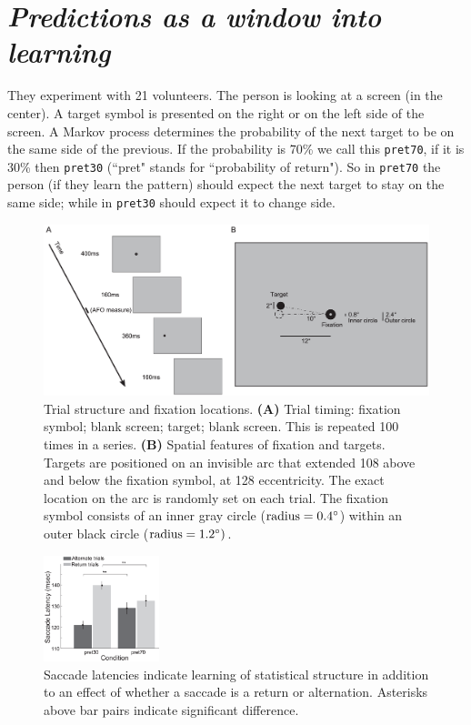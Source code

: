 \section[Predictions as a window into learning]{\textit{Predictions as a window into learning}\\ }
They experiment with 21 volunteers. The person is looking at a screen (in the center). A target symbol is presented on the right or on the left side of the screen. A Markov process determines the probability of the next target to be on the same side of the previous. If the probability is 70\% we call this \texttt{pret70}, if it is 30\% then \texttt{pret30} (``pret" stands for ``probability of return"). So in \texttt{pret70} the person (if they learn the pattern) should expect the next target to stay on the same side; while in \texttt{pret30} should expect it to change side.

\begin{figure}[!ht]
    \centering
    \captionsetup{width=.8\linewidth}
    \includegraphics[width=0.7\linewidth]{images/notaro.png}
    \caption{Trial structure and fixation locations. \textbf{(A)} Trial timing: fixation symbol; blank screen; target; blank screen. This is repeated 100 times in a series. \textbf{(B)} Spatial features of fixation and targets. Targets are positioned on an invisible arc that extended 108 above and below the fixation symbol, at 128 eccentricity. The exact location on the arc is randomly set on each trial. The fixation symbol consists of an inner gray circle ($\text{radius} = 0.4\degree$) within an outer black circle ($\text{radius} = 1.2\degree)$.}
    \label{fig:notaro}
\end{figure}

\begin{figure}
  \centering
  \includegraphics[width=0.3\textwidth]{images/saccade.png}
  \caption{Saccade latencies indicate learning of statistical structure in addition to an effect of whether a saccade is a return or alternation. Asterisks above bar pairs indicate significant difference.}
  \label{fig:saccade}
\end{figure}

